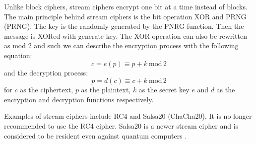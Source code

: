 Unlike block ciphers, stream ciphers encrypt one bit at a time instead of blocks. The main principle behind stream ciphers is the bit operation XOR and PRNG (\acl{PRNG}). The key is the randomly generated by the PNRG function. Then the message is XORed with generate key. The XOR operation can also be rewritten as mod $2$ and such we can describe the encryption process with the following equation:
\begin{equation}
  c = e(p)\equiv p + k\ \mathrm{mod}\,2
\end{equation}
\noindent and the decryption process:
\begin{equation}
  p = d(c)\equiv c + k\ \mathrm{mod}\,2
\end{equation}
\noindent for $c$ as the ciphertext, $p$ as the plaintext, $k$ as the secret key $e$ and $d$ as the encryption and decryption functions respectively\cite{Paar2010}.

Examples of stream ciphers include RC4 and Salsa20 (ChaCha20). It is no longer recommended to use the RC4 cipher\cite{Ristic2014}. Salsa20 is a newer stream cipher and is considered to be resident even against quantum computers \cite{Bernstein149}.
